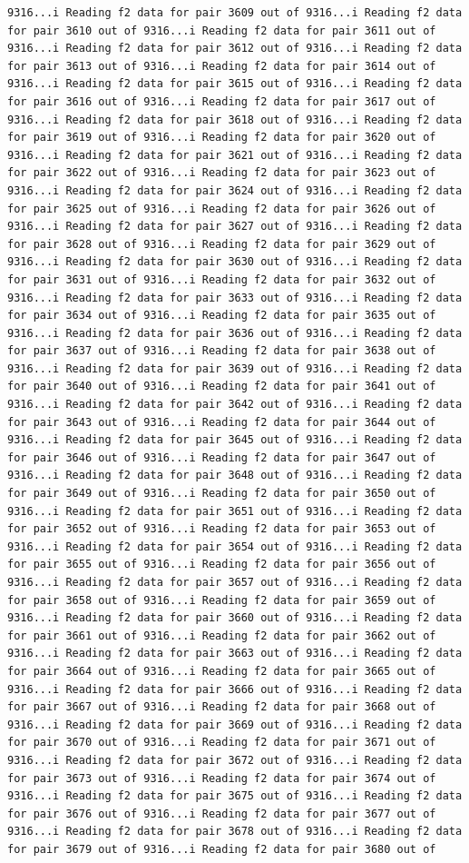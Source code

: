 \documentclass[
]{article}
\begin{document}
\begin{verbatim}
9316...i Reading f2 data for pair 3609 out of 9316...i Reading f2 data for pair 3610 out of 9316...i Reading f2 data for pair 3611 out of 9316...i Reading f2 data for pair 3612 out of 9316...i Reading f2 data for pair 3613 out of 9316...i Reading f2 data for pair 3614 out of 9316...i Reading f2 data for pair 3615 out of 9316...i Reading f2 data for pair 3616 out of 9316...i Reading f2 data for pair 3617 out of 9316...i Reading f2 data for pair 3618 out of 9316...i Reading f2 data for pair 3619 out of 9316...i Reading f2 data for pair 3620 out of 9316...i Reading f2 data for pair 3621 out of 9316...i Reading f2 data for pair 3622 out of 9316...i Reading f2 data for pair 3623 out of 9316...i Reading f2 data for pair 3624 out of 9316...i Reading f2 data for pair 3625 out of 9316...i Reading f2 data for pair 3626 out of 9316...i Reading f2 data for pair 3627 out of 9316...i Reading f2 data for pair 3628 out of 9316...i Reading f2 data for pair 3629 out of 9316...i Reading f2 data for pair 3630 out of 9316...i Reading f2 data for pair 3631 out of 9316...i Reading f2 data for pair 3632 out of 9316...i Reading f2 data for pair 3633 out of 9316...i Reading f2 data for pair 3634 out of 9316...i Reading f2 data for pair 3635 out of 9316...i Reading f2 data for pair 3636 out of 9316...i Reading f2 data for pair 3637 out of 9316...i Reading f2 data for pair 3638 out of 9316...i Reading f2 data for pair 3639 out of 9316...i Reading f2 data for pair 3640 out of 9316...i Reading f2 data for pair 3641 out of 9316...i Reading f2 data for pair 3642 out of 9316...i Reading f2 data for pair 3643 out of 9316...i Reading f2 data for pair 3644 out of 9316...i Reading f2 data for pair 3645 out of 9316...i Reading f2 data for pair 3646 out of 9316...i Reading f2 data for pair 3647 out of 9316...i Reading f2 data for pair 3648 out of 9316...i Reading f2 data for pair 3649 out of 9316...i Reading f2 data for pair 3650 out of 9316...i Reading f2 data for pair 3651 out of 9316...i Reading f2 data for pair 3652 out of 9316...i Reading f2 data for pair 3653 out of 9316...i Reading f2 data for pair 3654 out of 9316...i Reading f2 data for pair 3655 out of 9316...i Reading f2 data for pair 3656 out of 9316...i Reading f2 data for pair 3657 out of 9316...i Reading f2 data for pair 3658 out of 9316...i Reading f2 data for pair 3659 out of 9316...i Reading f2 data for pair 3660 out of 9316...i Reading f2 data for pair 3661 out of 9316...i Reading f2 data for pair 3662 out of 9316...i Reading f2 data for pair 3663 out of 9316...i Reading f2 data for pair 3664 out of 9316...i Reading f2 data for pair 3665 out of 9316...i Reading f2 data for pair 3666 out of 9316...i Reading f2 data for pair 3667 out of 9316...i Reading f2 data for pair 3668 out of 9316...i Reading f2 data for pair 3669 out of 9316...i Reading f2 data for pair 3670 out of 9316...i Reading f2 data for pair 3671 out of 9316...i Reading f2 data for pair 3672 out of 9316...i Reading f2 data for pair 3673 out of 9316...i Reading f2 data for pair 3674 out of 9316...i Reading f2 data for pair 3675 out of 9316...i Reading f2 data for pair 3676 out of 9316...i Reading f2 data for pair 3677 out of 9316...i Reading f2 data for pair 3678 out of 9316...i Reading f2 data for pair 3679 out of 9316...i Reading f2 data for pair 3680 out of 
\end{verbatim}
\end{document}
